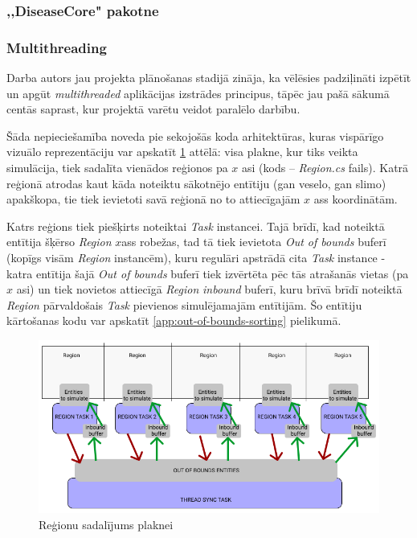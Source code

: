 \subsubsection{,,DiseaseCore" pakotne}
\subsubsection*{Multithreading}
Darba autors jau projekta plānošanas stadijā zināja, ka vēlēsies padziļināti
izpētīt un apgūt \emph{multithreaded} aplikācijas izstrādes principus, tāpēc jau pašā sākumā
centās saprast, kur projektā varētu veidot paralēlo darbību.

Šāda nepieciešamība noveda pie sekojošās koda arhitektūras, kuras vispārīgo
vizuālo reprezentāciju var apskatīt \ref{img:multithreaded-layout} attēlā: visa plakne, kur tiks
veikta simulācija, tiek sadalīta vienādos reģionos pa \(x\) asi (kods -- \emph{Region.cs} fails).
Katrā reģionā atrodas kaut kāda noteiktu sākotnējo entītiju (gan veselo, gan slimo) apakškopa,
tie tiek ievietoti savā reģionā no to attiecīgajām \(x\) ass koordinātām.

Katrs reģions tiek piešķirts noteiktai \emph{Task}\cite{csharp:task} instancei.
Tajā brīdī, kad noteiktā entītija šķērso \emph{Region} \(x\)ass robežas, tad tā tiek
ievietota \emph{Out of bounds} buferī (kopīgs visām \emph{Region} instancēm), kuru
regulāri apstrādā cita \emph{Task} instance - katra entītija šajā \emph{Out of bounds} buferī tiek
izvērtēta pēc tās atrašanās vietas (pa \(x\) asi) un tiek novietos attiecīgā \emph{Region}
\emph{inbound} buferī, kuru brīvā brīdī noteiktā \emph{Region} pārvaldošais \emph{Task} pievienos
simulējamajām entītijām. Šo entītiju kārtošanas kodu var apskatīt
\ref{app:out-of-bounds-sorting} pielikumā.


\begin{figure}[H]
	\centering
	\includegraphics[scale=0.5]{images/multithreaded-layout.png}
	\caption{Reģionu sadalījums plaknei}
	\label{img:multithreaded-layout}
\end{figure}

